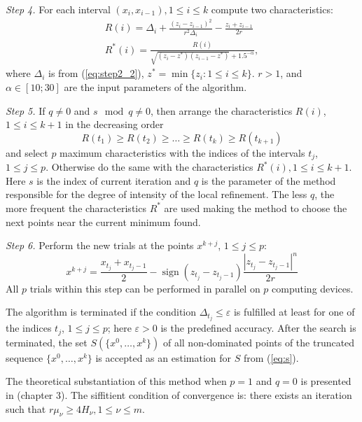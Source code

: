 \documentclass{llncs}
\DeclareMathOperator{\sign}{sign}
\begin{document}
\textit{Step 4.} For each interval \((x_i,x_{i-1}),1\leqslant i\leqslant k\) compute two
characteristics:
\begin{eqnarray}
  R(i) = \Delta_i + \frac{(z_i-z_{i-1})^2}{r^2\Delta_i}-\frac{z_i+z_{i-1}}{2r} \\
  R^*(i)=\frac{R(i)}{\sqrt{(z_i-z^*)(z_{i-1}-z^*)} + 1.5^{-\alpha}},
\end{eqnarray}
where \(\Delta_i\) is from (\ref{eq:step2_2}), \(z^*=\min\{z_i:1\leqslant i\leqslant k\}\). \(r>1\),
and \(\alpha\in [10;30]\) are the input parameters of the algorithm.

\textit{Step 5.} If \(q\not=0\) and \(s \mod q\not=0 \), then arrange the characteristics \(R(i)\),
\(1 \leqslant i \leqslant k + 1\) in the decreasing order
\begin{equation*}
  R(t_1) \geqslant R(t_2) \geqslant \dots \geqslant R(t_k) \geqslant R(t_{k+1})
\end{equation*}
and select \(p\) maximum characteristics with the indices of the intervals \(t_j\), \(1 \leqslant j
\leqslant p\). Otherwise do the same with the characteristics \(R^*(i),1\leqslant i\leqslant k+1\).
Here \(s\) is the index of current iteration and \(q\) is the parameter of the method responsible
for the degree of intensity of the local refinement. The less \(q\), the more frequent the
characteristics \(R^*\) are used making the method to choose the next points near the current
minimum found.

\textit{Step 6.} Perform the new trials at the points \(x^{k+j}\), \(1 \leqslant j \leqslant p\):
\begin{equation}
  x^{k+j}=\frac{x_{t_j}+x_{t_j-1}}{2} - \sign(z_{t_j} - z_{t_j-1})\frac{|z_{t_j} - z_{t_j-
1}|^n}{2r}
\end{equation}
All \(p\) trials within this step can be performed in parallel on \(p\) computing devices.

The algorithm is terminated if the condition \(\Delta_{t_j}\leqslant \varepsilon\) is fulfilled at
least for one of the indices \(t_j\), \(1\leqslant j\leqslant p\); here \(\varepsilon >0\) is the
predefined accuracy.
After the search is terminated, the set \(S(\{x^0,\dots ,x^k\})\) of all
non-dominated points of the truncated sequence \(\{x^0,\dots ,x^k\}\) is accepted as an
estimation for \(S\) from (\ref{eq:s}).

The theoretical substantiation of this method when \(p=1\) and \(q=0\) is presented in
\cite{strOptBook}(chapter 3). The siffitient condition of convergence is: there exists an
iteration such that \(r\mu_\nu \geqslant 4H_\nu, 1\leqslant \nu \leqslant m\).
\end{document}
